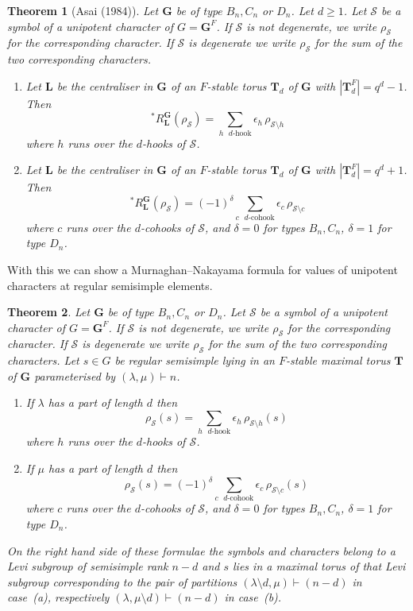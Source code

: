 \documentclass{ert-l}
\newcommand{\bG}{{\mathbf{G}}}
\newcommand{\bL}{{\mathbf{L}}}
\newcommand{\bT}{{\mathbf{T}}}
\newcommand{\cS}{{\mathcal{S}}}
\newcommand\sRLG{{\,{}^*R_\bL^\bG}}
\let\eps=\epsilon
\let\la=\lambda
\newtheorem{thm}{Theorem}[section]
\theoremstyle{definition}
\theoremstyle{remark}
\begin{document}
\begin{thm}[Asai (1984)]   \label{thm:Asai}
 Let $\bG$ be of type $B_n,C_n$ or $D_n$. Let $d\ge1$.
 Let $\cS$ be a symbol of a unipotent character of $G=\bG^F$. If $\cS$ is not
 degenerate, we write $\rho_\cS$ for the corresponding character. If $\cS$
 is degenerate we write $\rho_\cS$ for the sum of the two corresponding
 characters.
 \begin{enumerate}[\rm(a)]
  \item Let $\bL$ be the centraliser in $\bG$ of an $F$-stable torus $\bT_d$
   of $\bG$ with $|\bT_d^F|=q^d-1$. Then
   $$\sRLG(\rho_\cS)=\sum_{h\text{ $d$-hook}}\eps_h\,\rho_{\cS\setminus h}$$
   where $h$ runs over the $d$-hooks of $\cS$.
  \item Let $\bL$ be the centraliser in $\bG$ of an $F$-stable torus $\bT_d$
   of $\bG$ with $|\bT_d^F|=q^d+1$. Then
   $$\sRLG(\rho_\cS)=(-1)^\delta\sum_{c\text{ $d$-cohook}}
     \eps_c\,\rho_{\cS\setminus c}$$
   where $c$ runs over the $d$-cohooks of $\cS$, and $\delta=0$ for types
   $B_n,C_n$, $\delta=1$ for type $D_n$.
 \end{enumerate}
\end{thm}

With this we can show a Murnaghan--Nakayama formula for values of unipotent
characters at regular semisimple elements.

\begin{thm}   \label{thm:MN}
 Let $\bG$ be of type $B_n,C_n$ or $D_n$.
 Let $\cS$ be a symbol of a unipotent character of $G=\bG^F$. If $\cS$ is not
 degenerate, we write $\rho_\cS$ for the corresponding character. If $\cS$
 is degenerate we write  $\rho_\cS$ for the sum of the two corresponding
 characters.
 Let $s\in G$ be regular semisimple lying in an $F$-stable maximal torus $\bT$
 of $\bG$ parameterised by $(\la,\mu)\vdash n$.
 \begin{enumerate}[\rm(a)]
  \item If $\la$ has a part of length $d$ then
   $$\rho_\cS(s)=\sum_{h\text{ $d$-hook}}\eps_h\,\rho_{\cS\setminus h}(s)$$
   where $h$ runs over the $d$-hooks of $\cS$.
  \item If $\mu$ has a part of length $d$ then
   $$\rho_\cS(s)=(-1)^\delta\sum_{c\text{ $d$-cohook}}
     \eps_c\,\rho_{\cS\setminus c}(s)$$
   where $c$ runs over the $d$-cohooks of $\cS$, and $\delta=0$ for types
   $B_n,C_n$, $\delta=1$ for type $D_n$.
 \end{enumerate}
 On the right hand side of these formulae the symbols and characters belong
 to a Levi subgroup of semisimple rank $n-d$ and $s$ lies in a maximal torus
 of that Levi subgroup corresponding to the pair of partitions
 $(\lambda \setminus d,\mu) \vdash (n-d)$ in case~(a), respectively
 $(\lambda, \mu\setminus d) \vdash (n-d)$ in case~(b).
\end{thm}
\end{document}
